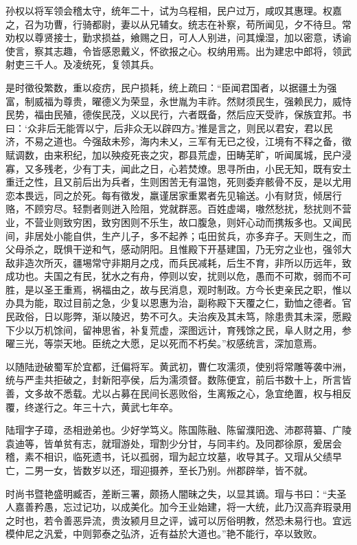 \documentclass[12pt,UTF8]{ctexbook}
\begin{document}
孙权以将军领会稽太守，统年二十，试为乌程相，民户过万，咸叹其惠理。权嘉之，召为功曹，行骑都尉，妻以从兄辅女。统志在补察，苟所闻见，夕不待旦。常劝权以尊贤接士，勤求损益，飨赐之日，可人人别进，问其燥湿，加以密意，诱谕使言，察其志趣，令皆感恩戴义，怀欲报之心。权纳用焉。出为建忠中郎将，领武射吏三千人。及凌统死，复领其兵。

是时徵役繁数，重以疫疠，民户损耗，统上疏曰：“臣闻君国者，以据疆土为强富，制威福为尊贵，曜德义为荣显，永世胤为丰祚。然财须民生，强赖民力，威恃民势，福由民殖，德俟民茂，义以民行，六者既备，然后应天受祚，保族宜邦。书曰：‘众非后无能胥以宁，后非众无以辟四方。’推是言之，则民以君安，君以民济，不易之道也。今强敌未殄，海内未乂，三军有无已之役，江境有不释之备，徵赋调数，由来积纪，加以殃疫死丧之灾，郡县荒虚，田畴芜旷，听闻属城，民户浸寡，又多残老，少有丁夫，闻此之日，心若焚燎。思寻所由，小民无知，既有安土重迁之性，且又前后出为兵者，生则困苦无有温饱，死则委弃骸骨不反，是以尤用恋本畏远，同之於死。每有徵发，羸谨居家重累者先见输送。小有财货，倾居行赂，不顾穷尽。轻剽者则迸入险阻，党就群恶。百姓虚竭，嗷然愁扰，愁扰则不营业，不营业则致穷困，致穷困则不乐生，故口腹急，则奸心动而携叛多也。又闻民间，非居处小能自供，生产儿子，多不起养；屯田贫兵，亦多弃子。天则生之，而父母杀之，既惧干逆和气，感动阴阳。且惟殿下开基建国，乃无穷之业也，强邻大敌非造次所灭，疆埸常守非期月之戍，而兵民减耗，后生不育，非所以历远年，致成功也。夫国之有民，犹水之有舟，停则以安，扰则以危，愚而不可欺，弱而不可胜，是以圣王重焉，祸福由之，故与民消息，观时制政。方今长吏亲民之职，惟以办具为能，取过目前之急，少复以恩惠为治，副称殿下天覆之仁，勤恤之德者。官民政俗，日以彫弊，渐以陵迟，势不可久。夫治疾及其未笃，除患贵其未深，愿殿下少以万机馀间，留神思省，补复荒虚，深图远计，育残馀之民，阜人财之用，参曜三光，等崇天地。臣统之大愿，足以死而不朽矣。”权感统言，深加意焉。

以随陆逊破蜀军於宜都，迁偏将军。黄武初，曹仁攻濡须，使别将常雕等袭中洲，统与严圭共拒破之，封新阳亭侯，后为濡须督。数陈便宜，前后书数十上，所言皆善，文多故不悉载。尤以占募在民间长恶败俗，生离叛之心，急宜绝置，权与相反覆，终遂行之。年三十六，黄武七年卒。

陆瑁字子璋，丞相逊弟也。少好学笃义。陈国陈融、陈留濮阳逸、沛郡蒋纂、广陵袁迪等，皆单贫有志，就瑁游处，瑁割少分甘，与同丰约。及同郡徐原，爰居会稽，素不相识，临死遗书，讬以孤弱，瑁为起立坟墓，收导其子。又瑁从父绩早亡，二男一女，皆数岁以还，瑁迎摄养，至长乃别。州郡辟举，皆不就。

时尚书暨艳盛明臧否，差断三署，颇扬人闇昧之失，以显其谪。瑁与书曰：“夫圣人嘉善矜愚，忘过记功，以成美化。加今王业始建，将一大统，此乃汉高弃瑕录用之时也，若令善恶异流，贵汝颍月旦之评，诚可以厉俗明教，然恐未易行也。宜远模仲尼之汎爱，中则郭泰之弘济，近有益於大道也。”艳不能行，卒以致败。
\end{document}
